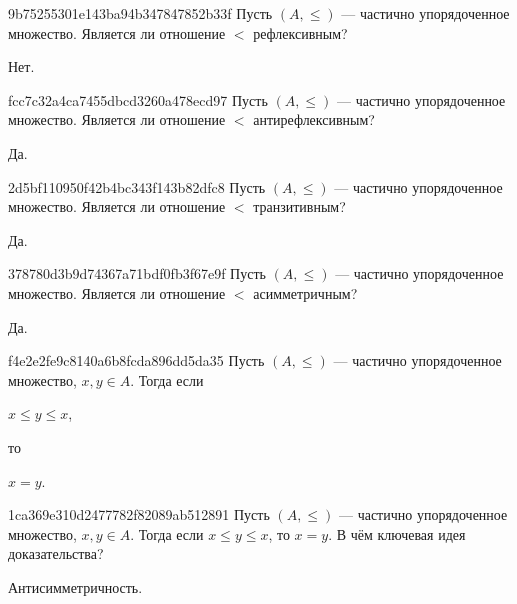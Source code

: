 \begin{note}{9b75255301e143ba94b347847852b33f}
    Пусть \({ (A, \leqslant) }\) --- частично упорядоченное множество.
    Является ли отношение \({ < }\) рефлексивным?

    \begin{cloze}{1}
        Нет.
    \end{cloze}
\end{note}

\begin{note}{fcc7c32a4ca7455dbcd3260a478ecd97}
    Пусть \({ (A, \leqslant) }\) --- частично упорядоченное множество.
    Является ли отношение \({ < }\) антирефлексивным?

   \begin{cloze}{1}
       Да.
   \end{cloze}
\end{note}

\begin{note}{2d5bf110950f42b4bc343f143b82dfc8}
    Пусть \({ (A, \leqslant) }\) --- частично упорядоченное множество.
    Является ли отношение \({ < }\) транзитивным?

    \begin{cloze}{1}
        Да.
    \end{cloze}
\end{note}

\begin{note}{378780d3b9d74367a71bdf0fb3f67e9f}
    Пусть \({ (A, \leqslant) }\) --- частично упорядоченное множество.
    Является ли отношение \({ < }\) асимметричным?

    \begin{cloze}{1}
        Да.
    \end{cloze}
\end{note}

\begin{note}{f4e2e2fe9c8140a6b8fcda896dd5da35}
    Пусть \({ (A, \leqslant) }\) --- частично упорядоченное множество, \({ x, y \in A }\).
    Тогда если \begin{icloze}{2}\({ x \leqslant y \leqslant x }\),\end{icloze} то \begin{icloze}{1}\({ x = y }\).\end{icloze}
\end{note}

\begin{note}{1ca369e310d2477782f82089ab512891}
    Пусть \({ (A, \leqslant) }\) --- частично упорядоченное множество, \({ x, y \in A }\).
    Тогда если \({ x \leqslant y \leqslant x }\), то \({ x = y }\).
    В чём ключевая идея доказательства?

    \begin{cloze}{1}
        Антисимметричность.
    \end{cloze}
\end{note}

